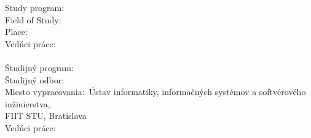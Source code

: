 \vspace*{6cm}
{
	Study program: \Program\\
	Field of Study: \Field\\
	Place: \Place\\
	Vedúci práce: \Supervisor \\\\
}
{
	Študijný program:~~~~~~~\Program\\
	Študijný odbor:~~~~~~~~~~~\Field\\
	Miesto vypracovania:~Ústav informatiky, informačných systémov a softvérového inžinierstva,\\
	\hspace*{3.8cm}FIIT STU, Bratislava\\
	Vedúci práce:~~~~~~~~~~~~~~\Supervisor \\\\
}
\Month \Year
\afterpage{\blankpage}
